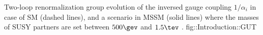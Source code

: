 {Two-loop renormalization group evolution of the inversed gauge coupling $1/\alpha_i$ in case of SM (dashed lines), and a scenario in MSSM (solid lines) where the masses of SUSY partners are set between $500\gev$ and $1.5\tev$ \cite{SUSYPrimer}.}
{fig::Introduction::GUT}



% 
% 



